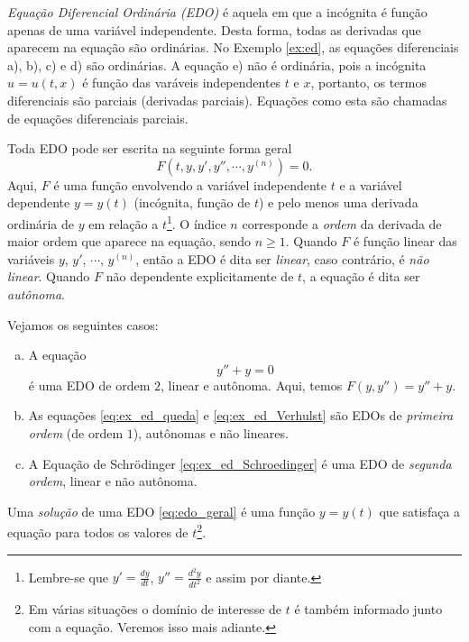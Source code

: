 \emph{Equação Diferencial Ordinária (EDO)} é aquela em que a incógnita é função apenas de uma variável independente. Desta forma, todas as derivadas que aparecem na equação são ordinárias. No Exemplo \ref{ex:ed}, as equações diferenciais a), b), c) e d) são ordinárias. A equação e) não é ordinária, pois a incógnita $u = u(t,x)$ é função das varáveis independentes $t$ e $x$, portanto, os termos diferenciais são parciais (derivadas parciais). Equações como esta são chamadas de equações diferenciais parciais.

Toda EDO pode ser escrita na seguinte forma geral
\begin{equation}\label{eq:edo_geral}
  F(t, y, y', y'', \cdots, y^{(n)}) = 0.
\end{equation}
Aqui, $F$ é uma função envolvendo a variável independente $t$ e a variável dependente $y = y(t)$ (incógnita, função de $t$) e pelo menos uma derivada ordinária de $y$ em relação a $t$\footnote{Lembre-se que $\displaystyle y' = \frac{dy}{dt}$, $y'' = \frac{d^2y}{dt^2}$ e assim por diante.}. O índice $n$ corresponde a \emph{ordem} da derivada de maior ordem que aparece na equação, sendo $n\geq 1$. Quando $F$ é função linear das variáveis $y$, $y'$, $\cdots$, $y^{(n)}$, então a EDO é dita ser \emph{linear}, caso contrário, é \emph{não linear}. Quando $F$ não dependente explicitamente de $t$, a equação é dita ser \emph{autônoma}.

\begin{ex}
  Vejamos os seguintes casos:
  \begin{enumerate}[a)]
  \item A equação
    \begin{equation}
      y'' + y = 0
    \end{equation}
    é uma EDO de ordem $2$, linear e autônoma. Aqui, temos $F(y, y'') = y'' + y$.
  \item As equações \eqref{eq:ex_ed_queda} e \eqref{eq:ex_ed_Verhulst} são EDOs de \emph{primeira ordem} (de ordem $1$), autônomas e não lineares.
  \item A Equação de Schrödinger \eqref{eq:ex_ed_Schroedinger} é uma EDO de \emph{segunda ordem}, linear e não autônoma.
  \end{enumerate}
\end{ex}

Uma \emph{solução} de uma EDO \eqref{eq:edo_geral} é uma função $y = y(t)$ que satisfaça a equação para todos os valores de $t$\footnote{Em várias situações o domínio de interesse de $t$ é também informado junto com a equação. Veremos isso mais adiante.}.

